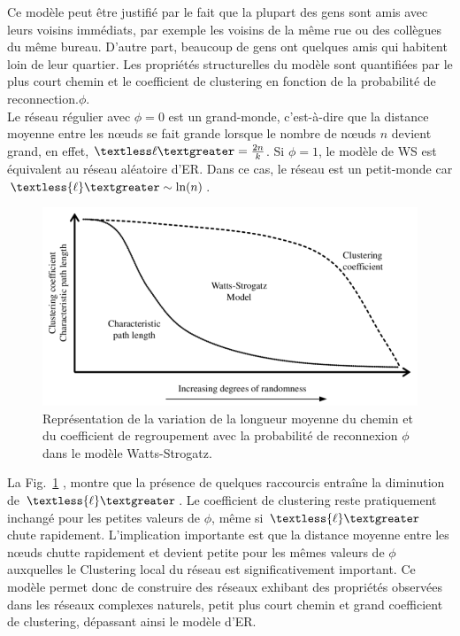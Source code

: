  Ce modèle peut être justifié par le fait que la plupart des gens sont amis avec leurs voisins immédiats, par exemple les voisins de la même rue ou des collègues du même bureau. D'autre part, beaucoup de gens ont quelques amis qui habitent loin de leur quartier. Les propriétés structurelles du modèle sont quantifiées par le plus court chemin et le coefficient de clustering en fonction de la probabilité de reconnection.$\phi$.\\
 Le réseau régulier avec $\phi=0$ est un grand-monde, c'est-à-dire que la distance moyenne entre les nœuds se fait grande lorsque le nombre de nœuds $n$ devient grand, en effet, $\textless \ell \textgreater=\frac{2n}{k}$. Si $\phi=1$, le modèle de WS est équivalent au réseau aléatoire d'ER. Dans ce cas, le réseau est un petit-monde car $\textless {\ell} \textgreater \sim \ln(n)$.\\ 
 \begin{figure}[h!]
 	\centering
 	\includegraphics[scale=0.45]{./figures/fig-SW5}
 	\caption{Représentation de la variation de la longueur moyenne du chemin et du coefficient de regroupement avec la probabilité de reconnexion $\phi$ dans le modèle Watts-Strogatz.}  	
 	\label{SW2}
 \end{figure}
 La Fig.~\ref{SW2} \cite{Watss-Strogatz1998}, montre que la présence de
 quelques raccourcis entraîne la diminution de $\textless {\ell} \textgreater$. Le
 coefficient de clustering reste pratiquement inchangé pour les petites valeurs de 
 $\phi$, m\^{e}me si $\textless {\ell} \textgreater$ chute rapidement. L'implication importante est que la distance moyenne entre les nœuds chutte rapidement et devient petite pour les mêmes valeurs de $\phi$ auxquelles le Clustering local du réseau est significativement important. Ce modèle permet donc de construire des réseaux exhibant des propriétés observées dans les réseaux complexes naturels, petit plus court chemin  et grand coefficient de clustering, dépassant ainsi le modèle d’ER.\\
